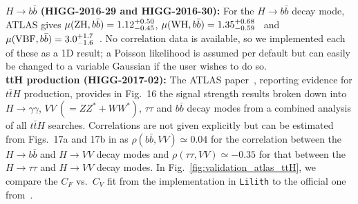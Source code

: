 
{\bf\boldmath $H\to b\bar b$ (HIGG-2016-29 and HIGG-2016-30):} For the $H\to b\bar b$ decay mode, ATLAS gives 
$\mu({\rm ZH}, b\bar b) = 1.12^{+0.50}_{-0.45}$, $\mu({\rm WH}, b\bar b) = 1.35^{+0.68}_{-0.59}$~\cite{Aaboud:2018gay} 
and $\mu({\rm VBF}, b\bar b) = 3.0^{+1.7}_{-1.6}$~\cite{Aaboud:2018gay}. 
No correlation data is available, so we implemented each of these as a 1D result; 
a Poisson likelihood is assumed per default but can easily be changed to a variable Gaussian if the user wishes to do so. \\


{\bf\boldmath ttH production (HIGG-2017-02):} The ATLAS paper~\cite{Aaboud:2017jvq}, reporting evidence for $t\bar tH$ production,  
provides in Fig.~16 the signal strength results broken down into $H\to \gamma\gamma$, $VV~(=ZZ^*+WW^*)$, $\tau\tau$ and $b\bar b$ 
decay modes from a combined analysis of all $t\bar tH$ searches.  
Correlations are not given explicitly but can be estimated from %
Figs.~17a and 17b in \cite{Aaboud:2017jvq} 
as $\rho(b\bar b, VV)\simeq 0.04$ for the correlation between the $H\to b\bar b$ and $H\to VV$ decay modes
and $\rho(\tau\tau, VV)\simeq -0.35$ for that between the $H\to \tau\tau$ and $H\to VV$ decay modes. 
In Fig.~\ref{fig:validation_atlas_ttH}, we compare the $C_F$ vs.\ $C_V$ fit from the implementation in {\tt Lilith} 
to the official one from~\cite{Aaboud:2017jvq}. 

